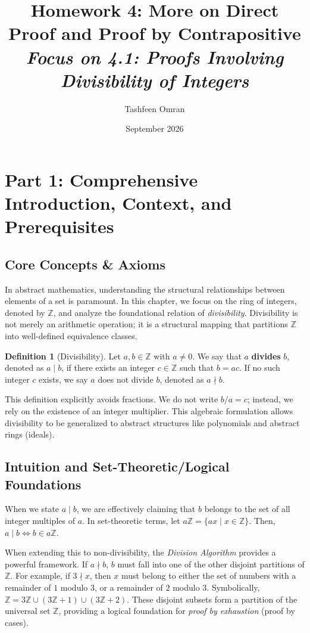 \documentclass[11pt]{article}
\title{\textbf{Homework 4: More on Direct Proof and Proof by Contrapositive}\\
\Large \textit{Focus on 4.1: Proofs Involving Divisibility of Integers}}
\author{Tashfeen Omran}
\date{September 2026}
\theoremstyle{definition}
\newtheorem{definition}[theorem]{Definition}
\theoremstyle{remark}
\begin{document}
\maketitle
\tableofcontents
\newpage

\section{Part 1: Comprehensive Introduction, Context, and Prerequisites}

\subsection{Core Concepts \& Axioms}
In abstract mathematics, understanding the structural relationships between elements of a set is paramount. In this chapter, we focus on the ring of integers, denoted by $\mathbb{Z}$, and analyze the foundational relation of \textit{divisibility}. Divisibility is not merely an arithmetic operation; it is a structural mapping that partitions $\mathbb{Z}$ into well-defined equivalence classes.

\begin{definition}[Divisibility]
Let $a, b \in \mathbb{Z}$ with $a \neq 0$. We say that $a$ \textbf{divides} $b$, denoted as $a \mid b$, if there exists an integer $c \in \mathbb{Z}$ such that $b = ac$. If no such integer $c$ exists, we say $a$ does not divide $b$, denoted as $a \nmid b$.
\end{definition}

This definition explicitly avoids fractions. We do not write $b/a = c$; instead, we rely on the existence of an integer multiplier. This algebraic formulation allows divisibility to be generalized to abstract structures like polynomials and abstract rings (ideals).

\subsection{Intuition and Set-Theoretic/Logical Foundations}
When we state $a \mid b$, we are effectively claiming that $b$ belongs to the set of all integer multiples of $a$. In set-theoretic terms, let $a\mathbb{Z} = \{ax \mid x \in \mathbb{Z}\}$. Then, $a \mid b \iff b \in a\mathbb{Z}$. 

When extending this to non-divisibility, the \textit{Division Algorithm} provides a powerful framework. If $a \nmid b$, $b$ must fall into one of the other disjoint partitions of $\mathbb{Z}$. For example, if $3 \nmid x$, then $x$ must belong to either the set of numbers with a remainder of $1$ modulo $3$, or a remainder of $2$ modulo $3$. Symbolically, $\mathbb{Z} = 3\mathbb{Z} \cup (3\mathbb{Z}+1) \cup (3\mathbb{Z}+2)$. These disjoint subsets form a partition of the universal set $\mathbb{Z}$, providing a logical foundation for \textit{proof by exhaustion} (proof by cases).
\end{document}
